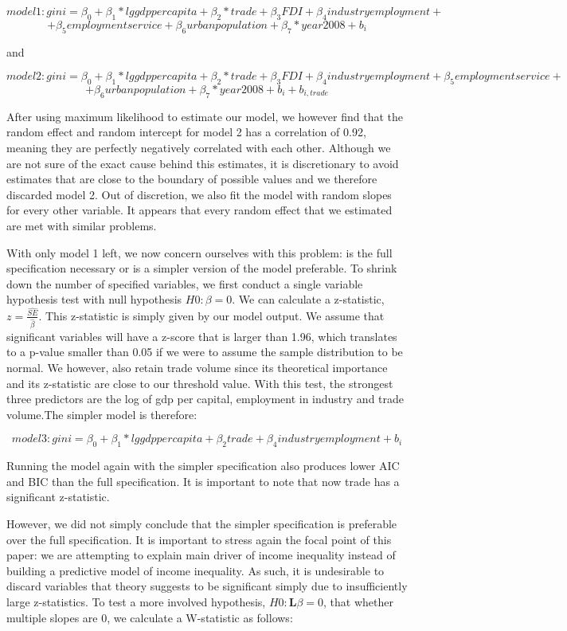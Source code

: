 \documentclass[
]{article}
\begin{document}
\[ model 1: gini = \beta_0 + \beta_1*{lggdp per capita} + \beta_2*{trade} + \beta_3{FDI} + \beta_4{industryemployment} +\]
\[+ \beta_5{employmentservice}+\beta_6{urbanpopulation} + \beta_7*year2008 + b_i\]

and

\[ model 2: gini = \beta_0 + \beta_1*{lggdp per capita} + \beta_2*{trade} + \beta_3{FDI} + \beta_4{industryemployment} + \beta_5{employmentservice} + \]
\[+ \beta_6{urbanpopulation}+ \beta_7*year2008 + b_i + b_{i,trade}\]

After using maximum likelihood to estimate our model, we however find
that the random effect and random intercept for model 2 has a
correlation of 0.92, meaning they are perfectly negatively correlated
with each other. Although we are not sure of the exact cause behind this
estimates, it is discretionary to avoid estimates that are close to the
boundary of possible values and we therefore discarded model 2. Out of
discretion, we also fit the model with random slopes for every other
variable. It appears that every random effect that we estimated are met
with similar problems.

With only model 1 left, we now concern ourselves with this problem: is
the full specification necessary or is a simpler version of the model
preferable. To shrink down the number of specified variables, we first
conduct a single variable hypothesis test with null hypothesis
\(H0 : \beta = 0\). We can calculate a z-statistic,
\(z = \frac{\hat{SE}}{\hat{\beta}}\). This z-statistic is simply given
by our model output. We assume that significant variables will have a
z-score that is larger than 1.96, which translates to a p-value smaller
than 0.05 if we were to assume the sample distribution to be normal. We
however, also retain trade volume since its theoretical importance and
its z-statistic are close to our threshold value. With this test, the
strongest three predictors are the log of gdp per capital, employment in
industry and trade volume.The simpler model is therefore:

\[
model 3:  gini = \beta_0 + \beta_1*{lggdp per capita} +\beta_2{trade}+ \beta_4{industryemployment}+b_i
\]

Running the model again with the simpler specification also produces
lower AIC and BIC than the full specification. It is important to note
that now trade has a significant z-statistic.

However, we did not simply conclude that the simpler specification is
preferable over the full specification. It is important to stress again
the focal point of this paper: we are attempting to explain main driver
of income inequality instead of building a predictive model of income
inequality. As such, it is undesirable to discard variables that theory
suggests to be significant simply due to insufficiently large
z-statistics. To test a more involved hypothesis,
\(H0 : \mathbf L \beta = 0\), that whether multiple slopes are 0, we
calculate a W-statistic as follows:
\end{document}
